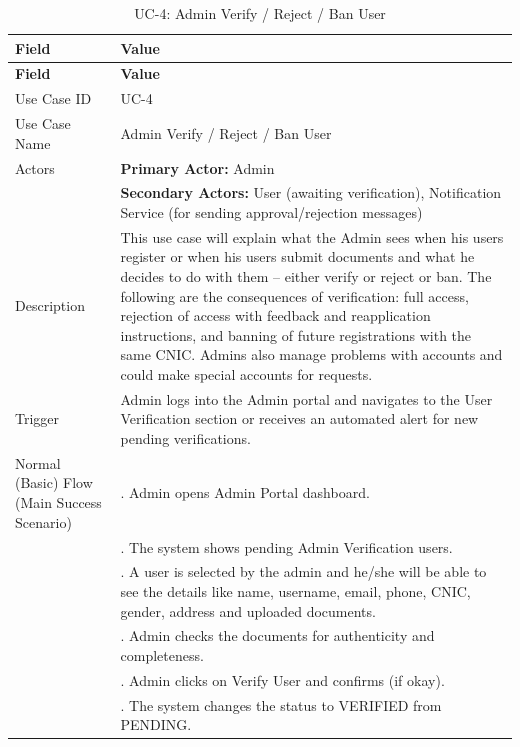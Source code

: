 \begin{longtable}{|>{\raggedright\arraybackslash}p{4cm}|>{\raggedright\arraybackslash}p{11cm}|}
\caption{UC-4: Admin Verify / Reject / Ban User}
\label{tab:uc-4} \\
\hline
\rowcolor{lightgray!30}
\textbf{Field} & \textbf{Value} \\
\hline
\endfirsthead
\hline
\rowcolor{lightgray!30}
\textbf{Field} & \textbf{Value} \\
\hline
\endhead
\hline
\endfoot
\hline
\endlastfoot
Use Case ID & UC-4 \\
\hline
Use Case Name & Admin Verify / Reject / Ban User \\
\hline
Actors & \textbf{Primary Actor:} Admin \\
& \textbf{Secondary Actors:} User (awaiting verification), Notification Service (for sending approval/rejection messages) \\
\hline
Description & This use case will explain what the Admin sees when his users register or when his users submit documents and what he decides to do with them – either verify or reject or ban. The following are the consequences of verification: full access, rejection of access with feedback and reapplication instructions, and banning of future registrations with the same CNIC. Admins also manage problems with accounts and could make special accounts for requests. \\
\hline
Trigger & Admin logs into the Admin portal and navigates to the User Verification section or receives an automated alert for new pending verifications. \\
\hline
Normal (Basic) Flow (Main Success Scenario) 
& 1. Admin opens Admin Portal dashboard. \\
& 2. The system shows pending Admin Verification users. \\
& 3. A user is selected by the admin and he/she will be able to see the details like name, username, email, phone, CNIC, gender, address and uploaded documents. \\
& 4. Admin checks the documents for authenticity and completeness. \\
& 5. Admin clicks on Verify User and confirms (if okay). \\
& 6. The system changes the status to VERIFIED from PENDING. \\

\end{longtable}
